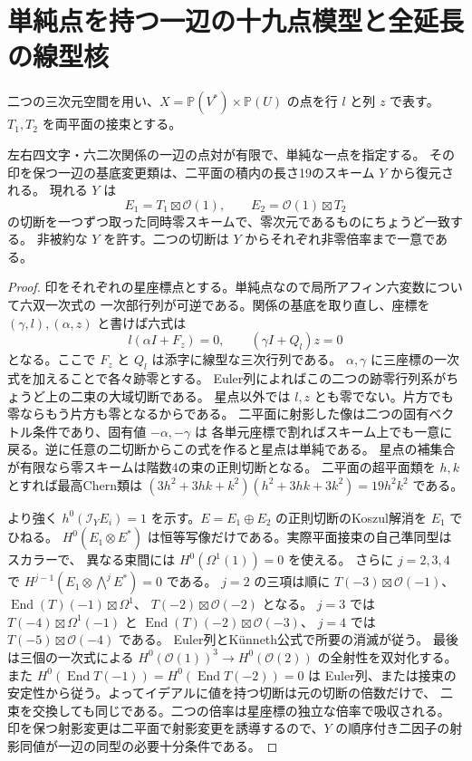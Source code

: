 \section{単純点を持つ一辺の十九点模型と全延長の線型核}
\label{sec:nineteen-point-edge}
二つの三次元空間を用い、$X=\mathbb P(V^*)\times\mathbb P(U)$ の点を行 $l$ と列 $z$ で表す。
$T_1,T_2$ を両平面の接束とする。
\begin{theorem}\label{thm:nineteen-point-edge}
左右四文字・六二次関係の一辺の点対が有限で、単純な一点を指定する。
その印を保つ一辺の基底変更類は、二平面の積内の長さ19のスキーム $Y$ から復元される。
現れる $Y$ は
\[
 E_1=T_1\boxtimes\mathcal O(1),\qquad E_2=\mathcal O(1)\boxtimes T_2
\]
の切断を一つずつ取った同時零スキームで、零次元であるものにちょうど一致する。
非被約な $Y$ を許す。二つの切断は $Y$ からそれぞれ非零倍率まで一意である。
\end{theorem}
\begin{proof}
印をそれぞれの星座標点とする。単純点なので局所アフィン六変数について六双一次式の
一次部行列が可逆である。関係の基底を取り直し、座標を $(\gamma,l),(\alpha,z)$ と書けば六式は
\[
 l(\alpha I+F_z)=0,\qquad (\gamma I+Q_l)z=0
\]
となる。ここで $F_z$ と $Q_l$ は添字に線型な三次行列である。
$\alpha,\gamma$ に三座標の一次式を加えることで各々跡零とする。
Euler列によればこの二つの跡零行列系がちょうど上の二束の大域切断である。
星点以外では $l,z$ とも零でない。片方でも零ならもう片方も零となるからである。
二平面に射影した像は二つの固有ベクトル条件であり、固有値 $-\alpha,-\gamma$ は
各単元座標で割ればスキーム上でも一意に戻る。逆に任意の二切断からこの式を作ると星点は単純である。
星点の補集合が有限なら零スキームは階数4の束の正則切断となる。
二平面の超平面類を $h,k$ とすれば最高Chern類は
$(3h^2+3hk+k^2)(h^2+3hk+3k^2)=19h^2k^2$ である。

より強く $h^0(\mathcal I_Y E_i)=1$ を示す。$E=E_1\oplus E_2$ の正則切断のKoszul解消を $E_1$ でひねる。
$H^0(E_1\otimes E^*)$ は恒等写像だけである。実際平面接束の自己準同型はスカラーで、
異なる束間には $H^0(\Omega^1(1))=0$ を使える。
さらに $j=2,3,4$ で $H^{j-1}(E_1\otimes\bigwedge^j E^*)=0$ である。
$j=2$ の三項は順に
$T(-3)\boxtimes\mathcal O(-1)$、$\operatorname{End}(T)(-1)\boxtimes\Omega^1$、
$T(-2)\boxtimes\mathcal O(-2)$ となる。
$j=3$ では $T(-4)\boxtimes\Omega^1(-1)$ と
$\operatorname{End}(T)(-2)\boxtimes\mathcal O(-3)$、
$j=4$ では $T(-5)\boxtimes\mathcal O(-4)$ である。
Euler列とKünneth公式で所要の消滅が従う。
最後は三個の一次式による $H^0(\mathcal O(1))^3\to H^0(\mathcal O(2))$ の全射性を双対化する。
また $H^0(\operatorname{End}T(-1))=H^0(\operatorname{End}T(-2))=0$ は
Euler列、または接束の安定性から従う。よってイデアルに値を持つ切断は元の切断の倍数だけで、
二束を交換しても同じである。二つの倍率は星座標の独立な倍率で吸収される。
印を保つ射影変更は二平面で射影変更を誘導するので、$Y$ の順序付き二因子の射影同値が一辺の同型の必要十分条件である。
\end{proof}

